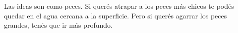 \documentclass[a6paper,10pt]{memoir}
\begin{document}
Las ideas son como peces.
Si querés atrapar a los peces más chicos te podés quedar en el agua cercana a la \mbox{superficie}.
Pero si querés agarrar los peces grandes, tenés que ir más profundo.
\end{document}

